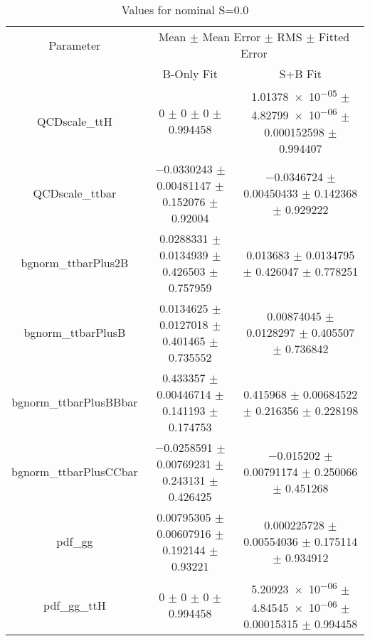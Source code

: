 \begin{table}
\centering
\caption{Values for nominal S=0.0}
\begin{tabular}{ccc}
\toprule
Parameter & \multicolumn{2}{c}{Mean $\pm$ Mean Error $\pm$ RMS $\pm$ Fitted Error}\\
 & B-Only Fit & S+B Fit\\
\midrule
QCDscale\_ttH & \num{0} $\pm$ \num{0} $\pm$ \num{0} $\pm$ \num{0.994458} & \num{1.01378e-05} $\pm$ \num{4.82799e-06} $\pm$ \num{0.000152598} $\pm$ \num{0.994407}\\
QCDscale\_ttbar & \num{-0.0330243} $\pm$ \num{0.00481147} $\pm$ \num{0.152076} $\pm$ \num{0.92004} & \num{-0.0346724} $\pm$ \num{0.00450433} $\pm$ \num{0.142368} $\pm$ \num{0.929222}\\
bgnorm\_ttbarPlus2B & \num{0.0288331} $\pm$ \num{0.0134939} $\pm$ \num{0.426503} $\pm$ \num{0.757959} & \num{0.013683} $\pm$ \num{0.0134795} $\pm$ \num{0.426047} $\pm$ \num{0.778251}\\
bgnorm\_ttbarPlusB & \num{0.0134625} $\pm$ \num{0.0127018} $\pm$ \num{0.401465} $\pm$ \num{0.735552} & \num{0.00874045} $\pm$ \num{0.0128297} $\pm$ \num{0.405507} $\pm$ \num{0.736842}\\
bgnorm\_ttbarPlusBBbar & \num{0.433357} $\pm$ \num{0.00446714} $\pm$ \num{0.141193} $\pm$ \num{0.174753} & \num{0.415968} $\pm$ \num{0.00684522} $\pm$ \num{0.216356} $\pm$ \num{0.228198}\\
bgnorm\_ttbarPlusCCbar & \num{-0.0258591} $\pm$ \num{0.00769231} $\pm$ \num{0.243131} $\pm$ \num{0.426425} & \num{-0.015202} $\pm$ \num{0.00791174} $\pm$ \num{0.250066} $\pm$ \num{0.451268}\\
pdf\_gg & \num{0.00795305} $\pm$ \num{0.00607916} $\pm$ \num{0.192144} $\pm$ \num{0.93221} & \num{0.000225728} $\pm$ \num{0.00554036} $\pm$ \num{0.175114} $\pm$ \num{0.934912}\\
pdf\_gg\_ttH & \num{0} $\pm$ \num{0} $\pm$ \num{0} $\pm$ \num{0.994458} & \num{5.20923e-06} $\pm$ \num{4.84545e-06} $\pm$ \num{0.00015315} $\pm$ \num{0.994458}\\
\bottomrule
\end{tabular}
\end{table}